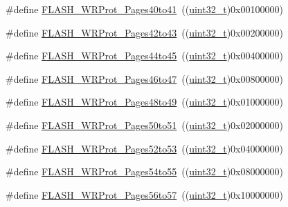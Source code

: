 \begin{DoxyCompactItemize}
\item 
\#define \hyperlink{group___option___bytes___write___protection_gaaf0c1391987f76b381d26ff4b5142268}{F\+L\+A\+S\+H\+\_\+\+W\+R\+Prot\+\_\+\+Pages40to41}~((\hyperlink{_p_e___types_8h_a33594304e786b158f3fb30289278f5af}{uint32\+\_\+t})0x00100000)
\item 
\#define \hyperlink{group___option___bytes___write___protection_gab9583317ad7ec30119cdd97e17e74121}{F\+L\+A\+S\+H\+\_\+\+W\+R\+Prot\+\_\+\+Pages42to43}~((\hyperlink{_p_e___types_8h_a33594304e786b158f3fb30289278f5af}{uint32\+\_\+t})0x00200000)
\item 
\#define \hyperlink{group___option___bytes___write___protection_ga934a862a6a5cd350f00f5ded27e4bbd4}{F\+L\+A\+S\+H\+\_\+\+W\+R\+Prot\+\_\+\+Pages44to45}~((\hyperlink{_p_e___types_8h_a33594304e786b158f3fb30289278f5af}{uint32\+\_\+t})0x00400000)
\item 
\#define \hyperlink{group___option___bytes___write___protection_ga8c9bd2510c0af75911a6b24271a33c95}{F\+L\+A\+S\+H\+\_\+\+W\+R\+Prot\+\_\+\+Pages46to47}~((\hyperlink{_p_e___types_8h_a33594304e786b158f3fb30289278f5af}{uint32\+\_\+t})0x00800000)
\item 
\#define \hyperlink{group___option___bytes___write___protection_ga12744383aa65b2eb38e37d41a12bb6fe}{F\+L\+A\+S\+H\+\_\+\+W\+R\+Prot\+\_\+\+Pages48to49}~((\hyperlink{_p_e___types_8h_a33594304e786b158f3fb30289278f5af}{uint32\+\_\+t})0x01000000)
\item 
\#define \hyperlink{group___option___bytes___write___protection_ga053321e47944270a5fdcf0d58e16ec13}{F\+L\+A\+S\+H\+\_\+\+W\+R\+Prot\+\_\+\+Pages50to51}~((\hyperlink{_p_e___types_8h_a33594304e786b158f3fb30289278f5af}{uint32\+\_\+t})0x02000000)
\item 
\#define \hyperlink{group___option___bytes___write___protection_gae4eefefb23e8913e4aa558a6a2599fa5}{F\+L\+A\+S\+H\+\_\+\+W\+R\+Prot\+\_\+\+Pages52to53}~((\hyperlink{_p_e___types_8h_a33594304e786b158f3fb30289278f5af}{uint32\+\_\+t})0x04000000)
\item 
\#define \hyperlink{group___option___bytes___write___protection_gacd4ea5e6cc3819f40a55a61f3075b626}{F\+L\+A\+S\+H\+\_\+\+W\+R\+Prot\+\_\+\+Pages54to55}~((\hyperlink{_p_e___types_8h_a33594304e786b158f3fb30289278f5af}{uint32\+\_\+t})0x08000000)
\item 
\#define \hyperlink{group___option___bytes___write___protection_ga1779d1131ad245861c61dbf43a2d2d3d}{F\+L\+A\+S\+H\+\_\+\+W\+R\+Prot\+\_\+\+Pages56to57}~((\hyperlink{_p_e___types_8h_a33594304e786b158f3fb30289278f5af}{uint32\+\_\+t})0x10000000)

\end{DoxyCompactItemize}
